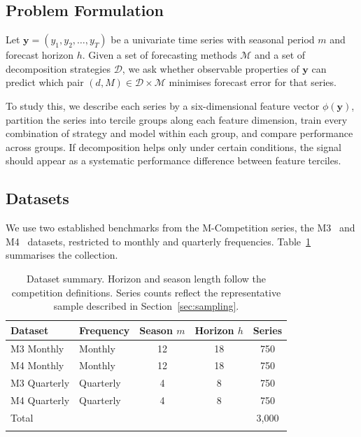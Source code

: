 \documentclass[pdflatex,sn-mathphys-num]{sn-jnl}
\theoremstyle{thmstyleone}
\theoremstyle{thmstyletwo}
\theoremstyle{thmstylethree}
\begin{document}
\subsection{Problem Formulation}\label{sec:problem}

Let $\mathbf{y} = (y_1, y_2, \ldots, y_T)$ be a univariate time series with
seasonal period $m$ and forecast horizon $h$. Given a set of forecasting
methods $\mathcal{M}$ and a set of decomposition strategies $\mathcal{D}$, we
ask whether observable properties of $\mathbf{y}$ can predict which pair
$(d, M) \in \mathcal{D} \times \mathcal{M}$ minimises forecast error for that
series.

To study this, we describe each series by a six-dimensional feature vector
$\phi(\mathbf{y})$, partition the series into tercile groups along each
feature dimension, train every combination of strategy and model within each
group, and compare performance across groups. If decomposition helps only
under certain conditions, the signal should appear as a systematic performance
difference between feature terciles.

\subsection{Datasets}\label{sec:data}

We use two established benchmarks from the M-Competition series, the
M3~\cite{makridakis2000m3} and M4~\cite{makridakis2020m4} datasets, restricted
to monthly and quarterly frequencies. Table~\ref{tab:datasets} summarises the
collection.

\begin{table}[ht]
\caption{Dataset summary. Horizon and season length follow the competition
definitions. Series counts reflect the representative sample described in
Section~\ref{sec:sampling}.}\label{tab:datasets}
\begin{tabular}{llccc}
\toprule
\textbf{Dataset} & \textbf{Frequency} & \textbf{Season $m$} &
\textbf{Horizon $h$} & \textbf{Series} \\
\midrule
M3 Monthly    & Monthly   & 12 & 18 & 750 \\
M4 Monthly    & Monthly   & 12 & 18 & 750 \\
M3 Quarterly  & Quarterly & 4  & 8  & 750 \\
M4 Quarterly  & Quarterly & 4  & 8  & 750 \\
\midrule
\multicolumn{4}{l}{Total} & 3{,}000 \\
\botrule
\end{tabular}
\end{table}
\end{document}

